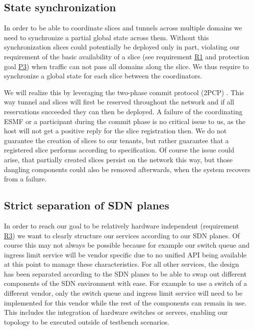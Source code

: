 \subsection{State synchronization}
In order to be able to coordinate slices and tunnels across multiple domains we need to synchronize a partial global state across them. Without this synchronization slices could potentially be deployed only in part, violating our requirement of the basic availability of a slice (see requirement \hyperref[R1]{R1} and protection goal \hyperref[P3]{P3}) when traffic can not pass all domains along the slice. We thus require to synchronize a global state for each slice between the coordinators.

We will realize this by leveraging the two-phase commit protocol (2PCP) \cite{2pcp}. This way tunnel and slices will first be reserved throughout the network and if all reservations succeeded they can then be deployed. A failure of the coordinating ESMF or a participant during the commit phase is no critical issue to us, as the host will not get a positive reply for the slice registration then. We do not guarantee the creation of slices to our tenants, but rather guarantee that a registered slice performs according to specification. Of course the issue could arise, that partially created slices persist on the network this way, but those dangling components could also be removed afterwards, when the system recovers from a failure.

\subsection{Strict separation of SDN planes}
In order to reach our goal to be relatively hardware independent (requirement \hyperref[R3]{R3}) we want to clearly structure our services according to our SDN planes. Of course this may not always be possible because for example our switch queue and ingress limit service will be vendor specific due to no unified API being available at this point to manage these characteristics. For all other services, the design has been separated according to the SDN planes to be able to swap out different components of the SDN environment with ease. For example to use a switch of a different vendor, only the switch queue and ingress limit service will need to be implemented for this vendor while the rest of the components can remain in use. This includes the integration of hardware switches or servers, enabling our topology to be executed outside of testbench scenarios.